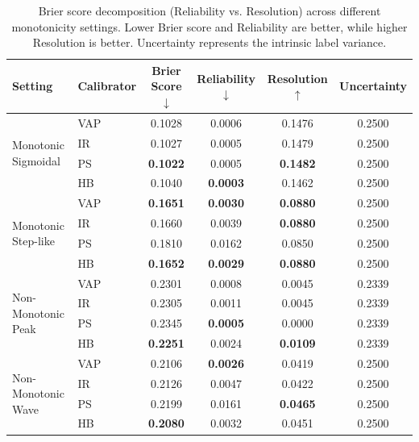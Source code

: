 \begin{table}[htbp]
\centering
\caption{Brier score decomposition (Reliability vs. Resolution) across different monotonicity settings. Lower Brier score and Reliability are better, while higher Resolution is better. Uncertainty represents the intrinsic label variance.}
\label{tab:brier_decomposition}
\begin{tabular}{llcccc}
\toprule
Setting & Calibrator & Brier Score $\downarrow$ & Reliability $\downarrow$ & Resolution $\uparrow$ & Uncertainty \\
\midrule
\multirow{4}{*}{Monotonic Sigmoidal} & VAP & 0.1028 & 0.0006 & 0.1476 & 0.2500 \\
 & IR & 0.1027 & 0.0005 & 0.1479 & 0.2500 \\
 & PS & \textbf{0.1022} & 0.0005 & \textbf{0.1482} & 0.2500 \\
 & HB & 0.1040 & \textbf{0.0003} & 0.1462 & 0.2500 \\
\midrule
\multirow{4}{*}{Monotonic Step-like} & VAP & \textbf{0.1651} & \textbf{0.0030} & \textbf{0.0880} & 0.2500 \\
 & IR & 0.1660 & 0.0039 & \textbf{0.0880} & 0.2500 \\
 & PS & 0.1810 & 0.0162 & 0.0850 & 0.2500 \\
 & HB & \textbf{0.1652} & \textbf{0.0029} & \textbf{0.0880} & 0.2500 \\
\midrule
\multirow{4}{*}{Non-Monotonic Peak} & VAP & 0.2301 & 0.0008 & 0.0045 & 0.2339 \\
 & IR & 0.2305 & 0.0011 & 0.0045 & 0.2339 \\
 & PS & 0.2345 & \textbf{0.0005} & 0.0000 & 0.2339 \\
 & HB & \textbf{0.2251} & 0.0024 & \textbf{0.0109} & 0.2339 \\
\midrule
\multirow{4}{*}{Non-Monotonic Wave} & VAP & 0.2106 & \textbf{0.0026} & 0.0419 & 0.2500 \\
 & IR & 0.2126 & 0.0047 & 0.0422 & 0.2500 \\
 & PS & 0.2199 & 0.0161 & \textbf{0.0465} & 0.2500 \\
 & HB & \textbf{0.2080} & 0.0032 & 0.0451 & 0.2500 \\
\bottomrule
\end{tabular}
\end{table}
